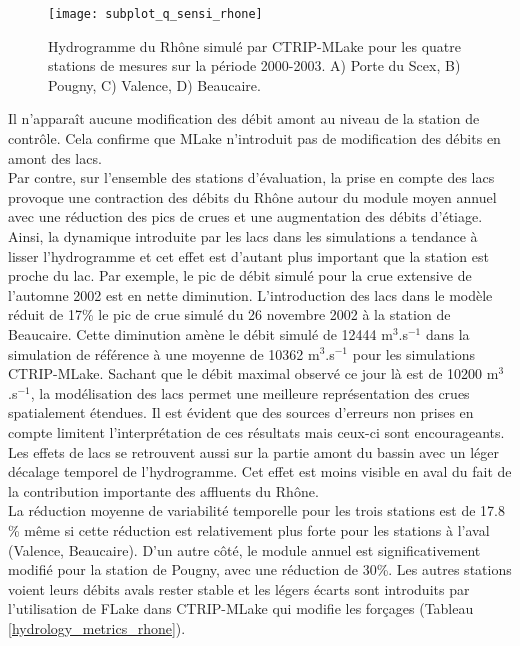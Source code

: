 \begin{figure}[h!]
\texttt{[image: subplot\_q\_sensi\_rhone]}
\caption{Hydrogramme du Rhône simulé par CTRIP-MLake pour les quatre stations de mesures sur la période 2000-2003. A) Porte du Scex, B) Pougny, C) Valence, D) Beaucaire.}
\label{q_sensi_rhone}
\end{figure}
\clearpage
Il n'apparaît aucune modification des débit amont au niveau de la station de contrôle. Cela confirme que MLake n'introduit pas de modification des débits en amont des lacs. \\
Par contre, sur l'ensemble des stations d'évaluation, la prise en compte des lacs provoque une contraction des débits du Rhône autour du module moyen annuel avec une réduction des pics de crues et une augmentation des débits d'étiage. Ainsi, la dynamique introduite par les lacs dans les simulations a tendance à lisser l'hydrogramme et cet effet est d'autant plus important que la station est proche du lac. Par exemple, le pic de débit simulé pour la crue extensive de l'automne 2002 est en nette diminution. L'introduction des lacs dans le modèle réduit de 17\% le pic de crue simulé du 26 novembre 2002 à la station de Beaucaire. Cette diminution amène le débit simulé de 12444 m$^{3}$.s$^{-1}$ dans la simulation de référence à une moyenne de 10362 m$^{3}$.s$^{-1}$ pour les simulations CTRIP-MLake. Sachant que le débit maximal observé ce jour là est de 10200 m$^{3}$.s$^{-1}$, la modélisation des lacs permet une meilleure représentation des crues spatialement étendues. Il est évident que des sources d'erreurs non prises en compte limitent l'interprétation de ces résultats mais ceux-ci sont encourageants.\\

Les effets de lacs se retrouvent aussi sur la partie amont du bassin avec un léger décalage temporel de l'hydrogramme. Cet effet est moins visible en aval du fait de la contribution importante des affluents du Rhône.\\ 
La réduction moyenne de variabilité temporelle pour les trois stations est de 17.8 \% même si  cette réduction est relativement plus forte pour les stations à l'aval (Valence, Beaucaire). D'un autre côté, le module annuel est significativement modifié pour la station de Pougny, avec une réduction de 30\%. Les autres stations voient leurs débits avals rester stable et les légers écarts sont introduits par l'utilisation de FLake dans CTRIP-MLake qui modifie les forçages (Tableau \ref{hydrology_metrics_rhone}).\\

